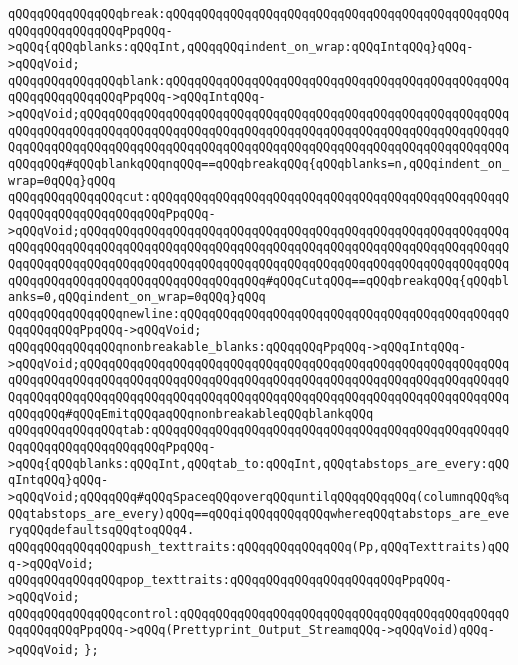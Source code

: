 \newline
\verb|qQQqqQQqqQQqqQQqbreak:qQQqqQQqqQQqqQQqqQQqqQQqqQQqqQQqqQQqqQQqqQQqqQQqqQQqqQQqqQQqqQQqPpqQQq->qQQq{qQQqblanks:qQQqInt,qQQqqQQqindent_on_wrap:qQQqIntqQQq}qQQq->qQQqVoid;|\newline
\newline
\verb|qQQqqQQqqQQqqQQqblank:qQQqqQQqqQQqqQQqqQQqqQQqqQQqqQQqqQQqqQQqqQQqqQQqqQQqqQQqqQQqqQQqPpqQQq->qQQqIntqQQq->qQQqVoid;qQQqqQQqqQQqqQQqqQQqqQQqqQQqqQQqqQQqqQQqqQQqqQQqqQQqqQQqqQQqqQQqqQQqqQQqqQQqqQQqqQQqqQQqqQQqqQQqqQQqqQQqqQQqqQQqqQQqqQQqqQQqqQQqqQQqqQQqqQQqqQQqqQQqqQQqqQQqqQQqqQQqqQQqqQQqqQQqqQQqqQQqqQQqqQQqqQQqqQQqqQQqqQQq#qQQqblankqQQqnqQQq==qQQqbreakqQQq{qQQqblanks=n,qQQqindent_on_wrap=0qQQq}qQQq|\newline
\verb|qQQqqQQqqQQqqQQqcut:qQQqqQQqqQQqqQQqqQQqqQQqqQQqqQQqqQQqqQQqqQQqqQQqqQQqqQQqqQQqqQQqqQQqqQQqPpqQQq->qQQqVoid;qQQqqQQqqQQqqQQqqQQqqQQqqQQqqQQqqQQqqQQqqQQqqQQqqQQqqQQqqQQqqQQqqQQqqQQqqQQqqQQqqQQqqQQqqQQqqQQqqQQqqQQqqQQqqQQqqQQqqQQqqQQqqQQqqQQqqQQqqQQqqQQqqQQqqQQqqQQqqQQqqQQqqQQqqQQqqQQqqQQqqQQqqQQqqQQqqQQqqQQqqQQqqQQqqQQqqQQqqQQqqQQqqQQqqQQqqQQq#qQQqCutqQQq==qQQqbreakqQQq{qQQqblanks=0,qQQqindent_on_wrap=0qQQq}qQQq|\newline
\verb|qQQqqQQqqQQqqQQqnewline:qQQqqQQqqQQqqQQqqQQqqQQqqQQqqQQqqQQqqQQqqQQqqQQqqQQqqQQqPpqQQq->qQQqVoid;|\newline
\verb|qQQqqQQqqQQqqQQqnonbreakable_blanks:qQQqqQQqPpqQQq->qQQqIntqQQq->qQQqVoid;qQQqqQQqqQQqqQQqqQQqqQQqqQQqqQQqqQQqqQQqqQQqqQQqqQQqqQQqqQQqqQQqqQQqqQQqqQQqqQQqqQQqqQQqqQQqqQQqqQQqqQQqqQQqqQQqqQQqqQQqqQQqqQQqqQQqqQQqqQQqqQQqqQQqqQQqqQQqqQQqqQQqqQQqqQQqqQQqqQQqqQQqqQQqqQQqqQQqqQQqqQQqqQQq#qQQqEmitqQQqaqQQqnonbreakableqQQqblankqQQq|\newline
\verb|qQQqqQQqqQQqqQQqtab:qQQqqQQqqQQqqQQqqQQqqQQqqQQqqQQqqQQqqQQqqQQqqQQqqQQqqQQqqQQqqQQqqQQqqQQqPpqQQq->qQQq{qQQqblanks:qQQqInt,qQQqtab_to:qQQqInt,qQQqtabstops_are_every:qQQqIntqQQq}qQQq->qQQqVoid;qQQqqQQq#qQQqSpaceqQQqoverqQQquntilqQQqqQQqqQQq(columnqQQq%qQQqtabstops_are_every)qQQq==qQQqiqQQqqQQqqQQqwhereqQQqtabstops_are_everyqQQqdefaultsqQQqtoqQQq4.|\newline
\newline
\newline
\verb|qQQqqQQqqQQqqQQqpush_texttraits:qQQqqQQqqQQqqQQq(Pp,qQQqTexttraits)qQQq->qQQqVoid;|\newline
\verb|qQQqqQQqqQQqqQQqpop_texttraits:qQQqqQQqqQQqqQQqqQQqqQQqPpqQQq->qQQqVoid;|\newline
\newline
\newline
\verb|qQQqqQQqqQQqqQQqcontrol:qQQqqQQqqQQqqQQqqQQqqQQqqQQqqQQqqQQqqQQqqQQqqQQqqQQqqQQqPpqQQq->qQQq(Prettyprint_Output_StreamqQQq->qQQqVoid)qQQq->qQQqVoid;|\newline
\verb|};|\newline
\newline

